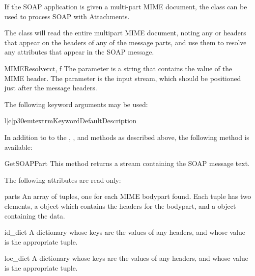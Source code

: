 If the SOAP application is given a multi-part MIME document, the
 class can be used to process SOAP with Attachments.

The  class will read the entire multipart MIME document,
noting any  or  headers that appear
on the headers of any of the message parts, and use them to resolve
any  attributes that appear in the SOAP message.

\begin{classdesc}{MIMEResolver}{ct, f}
The  parameter is a string that contains the value of the
MIME  header.
The  parameter is the input stream, which should be positioned just
after the message headers.

The following keyword arguments may be used:

\begin{tableiii}{l|c|p{30em}}{textrm}{Keyword}{Default}{Description}
\end{tableiii}
\end{classdesc}

In addition to to the , , and  methods
as described above, the following method is available:

\begin{methoddesc}{GetSOAPPart}{}
This method returns a stream containing the SOAP message text.
\end{methoddesc}

The following attributes are read-only:

\begin{memberdesc}{parts}
An array of tuples, one for each MIME bodypart found.
Each tuple has two elements, a  object
which contains the headers for the bodypart, and a
 object containing the data.
\end{memberdesc}

\begin{memberdesc}{id_dict}
A dictionary whose keys are the values of any 
headers, and whose value is the appropriate  tuple.
\end{memberdesc}

\begin{memberdesc}{loc_dict}
A dictionary whose keys are the values of any 
headers, and whose value is the appropriate  tuple.
\end{memberdesc}

